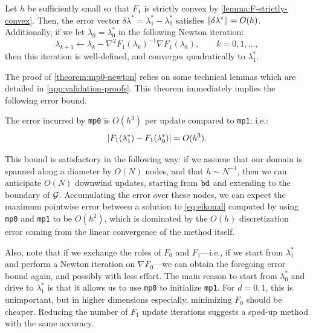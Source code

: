 \documentclass[sisc-eikonal.tex]{subfiles}
\begin{document}
\begin{theorem}\label{theorem:mp0-newton}
  Let $h$ be sufficiently small so that $F_1$ is strictly convex by
  \cref{lemma:F-strictly-convex}. Then, the error vector
  $\delta\lambda^* = \lambda_1^* - \lambda_0^*$ satisfies
  $\left\|\delta\lambda^*\right\| = O(h)$. Additionally, if we let
  $\lambda_0 = \lambda_0^*$ in the following Newton iteration:
  \begin{equation}
    \label{eq:lam0-iter-to-lam1}
    \lambda_{k+1} \gets \lambda_k - \nabla^2 F_1(\lambda_k)^{-1} \nabla F_1(\lambda_k), \qquad k = 0, 1, \hdots,
  \end{equation}
  then this iteration is well-defined, and converges quadratically to
  $\lambda_1^*$.
\end{theorem}

The proof of \cref{theorem:mp0-newton} relies on some technical
lemmas which are detailed in \cref{app:validation-proofs}. This
theorem immediately implies the following error bound.

\begin{theorem}\label{thm:mp0-error}
  The error incurred by \texttt{mp0} is $O(h^3)$ per update compared
  to \texttt{mp1}; i.e.:
  \begin{equation}
    \label{eq:mp0-error}
    \abs{F_1(\lambda_1^*) - F_1(\lambda_0^*)} = O(h^3).
  \end{equation}
\end{theorem}

This bound is satisfactory in the following way: if we assume that our
domain is spanned along a diameter by $O(N)$ nodes, and that
$h \sim N^{-1}$, then we can anticipate $O(N)$ downwind updates,
starting from $\texttt{bd}$ and extending to the boundary of
$\mathcal{G}$. Accumulating the error over these nodes, we can expect the
maximum pointwise error between a solution to \cref{eq:eikonal}
computed by using \texttt{mp0} and \texttt{mp1} to be $O(h^2)$, which
is dominated by the $O(h)$ discretization error coming from the linear
convergence of the method itself.

Also, note that if we exchange the roles of $F_0$ and $F_1$---i.e., if
we start from $\lambda_1^*$ and perform a Newton iteration on
$\nabla F_0$---we can obtain the foregoing error bound again, and
possibly with less effort. The main reason to start from $\lambda_0^*$
and drive to $\lambda_1^*$ is that it allows us to use \texttt{mp0} to
initialize \texttt{mp1}. For $d = 0, 1$, this is unimportant, but in
higher dimensions especially, minimizing $F_0$ should be
cheaper. Reducing the number of $F_1$ update iterations suggests a
sped-up method with the same accuracy.
\end{document}
